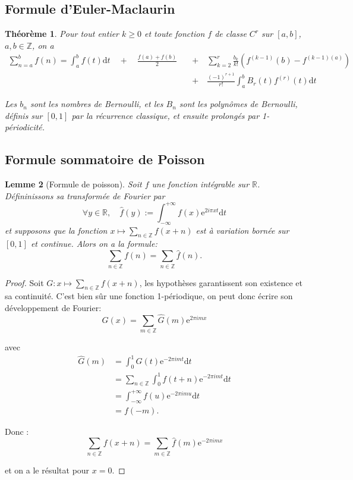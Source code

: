 \documentclass[french]{report}
\newtheorem{theorem}{Théorème}[section]
\newtheorem{lemma}[theorem]{Lemme}
\begin{document}
\subsection{Formule d'Euler-Maclaurin}

\begin{theorem}\label{eq:euler-maclaurin}
  Pour tout entier $k\geq0$ et toute fonction $f$ de classe $C^r$ sur $[a,b]$, $a,b\in\mathbb{Z}$, on a
  \begin{align*}
    \sum_{n=a}^b f(n) = \int_a^b f(t)\mathrm{d}t \quad + \quad \frac{f(a) + f(b)}{2} \quad &+ \quad \sum_{k=2}^r\frac{b_{k}}{k!}(f^{(k-1)}(b) - f^{(k-1)(a)}) \\
    &+ \quad \frac{(-1)^{r+1}}{r!}\int_a^b B_r(t)f^{(r)}(t)\mathrm{d}t
  \end{align*}

  Les $b_n$ sont les nombres de Bernoulli, et les $B_n$ sont les polynômes de Bernoulli, définis sur $[0,1]$ par la récurrence classique, et ensuite prolongés par 1-périodicité.
\end{theorem}

\subsection{Formule sommatoire de Poisson}

\begin{lemma}[Formule de poisson]\label{lem:formule-poisson}
  Soit $f$ une fonction intégrable sur $\mathbb{R}$. Défininissons sa transformée de Fourier par
  \[
    \forall y\in\mathbb{R},\quad\hat{f}(y):=\int_{-\infty}^{+\infty}f(x)\mathrm{e}^{2i\pi xt}\mathrm{d}t
  \]
  et supposons que la fonction $x\mapsto\sum_{n\in\mathbb{Z}}f(x+n)$ est à variation bornée sur $[0,1]$ et continue. Alors on a la formule:
  \[
    \sum_{n\in\mathbb{Z}}f(n)=\sum_{n\in\mathbb{Z}}\hat{f}(n).
  \]
\end{lemma}

\begin{proof}
  Soit $G:x\mapsto\sum_{n\in\mathbb{Z}}f(x+n)$, les hypothèses garantissent son existence et sa continuité. C'est bien sûr une fonction 1-périodique, on peut donc écrire son développement de Fourier:
  \[
    G(x)
    =\sum_{m\in\mathbb{Z}}\hat{G}(m)\mathrm{e}^{2\pi imx}
  \]

  avec
  \begin{align*}
    \hat{G}(m)
    &= \int_0^1 G(t)\mathrm{e}^{-2\pi imt}\mathrm{d}t \\
    &= \sum_{n\in\mathbb{Z}}\int_0^1 f(t+n)\mathrm{e}^{-2\pi imt}\mathrm{d}t \\
    &= \int_{-\infty}^{+\infty} f(u)\mathrm{e}^{-2\pi imu}\mathrm{d}t \\
    &= f(-m).
  \end{align*}

  Donc :
  \[
    \sum_{n\in\mathbb{Z}}f(x+n) = \sum_{m\in\mathbb{Z}}\hat{f}(m)\mathrm{e}^{-2\pi imx}
  \]

  et on a le résultat pour $x=0$.
\end{proof}
\end{document}

